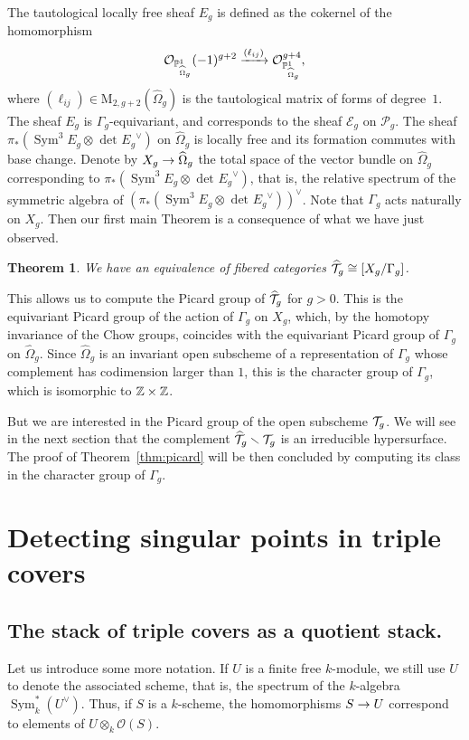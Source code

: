 \documentclass{amsart}
\numberwithin{equation}{section}
\numberwithin{subsection}{section}
\newtheorem{theorem}{Theorem}[section]
\theoremstyle{definition}
\theoremstyle{remark}
\newcommand\cE{\mathcal{E}} \newcommand\cF{\mathcal{F}}
\newcommand\cO{\mathcal{O}} \newcommand\cP{\mathcal{P}}
\newcommand\rM{\mathrm{M}} \newcommand\rN{\mathrm{N}}
\newcommand\arr{\ifinner\to\else\longrightarrow\fi}
\newcommand{\xarr}{\xrightarrow}
\renewcommand{\setminus}{\smallsetminus}
\newcommand{\T}[1][g]{\cT_{#1}}
\newcommand{\OT}[1][g]{\widehat{\cT}_{#1}}
\newcommand{\pone}{\PP^{1}}
\newcommand{\sym}{\operatorname{Sym}}
\newcommand{\symthree}[2][]{\sym^{3}_{{#1}}{#2} \otimes_{{#1}} \det\nolimits_{{#1}} {#2}\dual}
\newcommand{\dual}{^{\vee}}
\begin{document}
The tautological locally free sheaf $E_{g}$ is defined as the cokernel of the homomorphism
   \[
   \cO_{\pone_{\widehat{\Omega}_{g}}}(-1)^{g+2} \xarr{(\ell_{ij})}
   \cO_{\pone_{\widehat{\Omega}_{g}}}^{g+4},
   \]
where $(\ell_{ij}) \in \rM_{2, g+2}(\widehat{\Omega}_{g})$ is the tautological matrix of forms of degree~$1$. The sheaf $E_{g}$ is $\Gamma_{g}$-equivariant, and corresponds to the sheaf $\cE_{g}$ on $\cP_{g}$. The sheaf $\pi_{*}(\symthree{E_{g}})$ on $\widehat{\Omega}_{g}$ is locally free and its formation commutes with base change. Denote by $X_{g} \arr \widehat{\Omega}_{g}$ the total space of the vector bundle on $\widehat{\Omega}_{g}$ corresponding to $\pi_{*}(\symthree{E_{g}})$, that is, the relative spectrum of the symmetric algebra of $(\pi_{*}(\symthree{E_{g}}))\dual$. Note that $\Gamma_{g}$ acts naturally on $X_{g}$. Then our first main Theorem is a consequence of what we have just observed.


\begin{theorem}\label{quotient}
We have an equivalence of fibered categories $\OT\cong[X_{g}/\Gamma_{g}]$.

\end{theorem}


This allows us to compute the Picard group of $\OT$ for $g > 0$. This is the equivariant Picard group of the action of $\Gamma_{g}$ on $X_{g}$, which, by the homotopy invariance of the Chow groups, coincides with the equivariant Picard group of $\Gamma_{g}$ on $\widehat{\Omega}_{g}$. Since $\widehat{\Omega}_{g}$ is an invariant open subscheme of a representation of $\Gamma_{g}$ whose complement has codimension larger than $1$, this is the character group of $\Gamma_{g}$, which is isomorphic to $\mathbb{Z} \times \mathbb{Z}$.

But we are interested in the Picard group of the open subscheme $\T$. We will see in the next section that the complement $\OT \setminus \T$ is an irreducible hypersurface. The proof of Theorem~\ref{thm:picard} will be then concluded by computing its class in the character group of $\Gamma_{g}$.




\section{Detecting singular points in triple covers}\label{secdet}


\subsection{The stack of triple covers as a quotient stack.} Let us introduce some more notation. If $U$ is a finite free $k$-module, we still use $U$ to denote the associated scheme, that is, the spectrum of the $k$-algebra $\sym_{k}^{*}(U\dual)$. Thus, if $S$ is a $k$-scheme, the homomorphisms $S\arr U$ correspond to elements of $U \otimes_{k} \cO(S)$.
\end{document}
